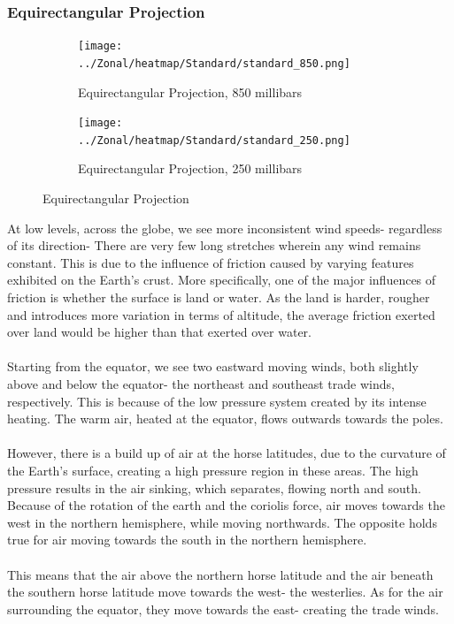 \documentclass[hidelinks]{article}
\begin{document}
\subsubsection{Equirectangular Projection}
\begin{figure}[h!]
	\begin{subfigure}[b]{\linewidth}
		\centering
		\texttt{[image: ../Zonal/heatmap/Standard/standard\_850.png]}
		\caption{Equirectangular Projection, 850 millibars}
	\end{subfigure}
	\begin{subfigure}[b]{\linewidth}
		\centering
		\texttt{[image: ../Zonal/heatmap/Standard/standard\_250.png]}
		\caption{Equirectangular Projection, 250 millibars}
	\end{subfigure}
	\caption{Equirectangular Projection}
\end{figure}
\newpage
\noindent At low levels, across the globe, we see more inconsistent wind speeds- regardless of its direction- There are very few long stretches wherein any wind remains constant. This is due to the influence of friction caused by varying features exhibited on the Earth's crust. 
More specifically, one of the major influences of friction is whether the surface is land or water. As the land is harder, rougher and introduces more variation in terms of altitude, the average friction exerted over land would be higher than that exerted over water.
\\\\
Starting from the equator, we see two eastward moving winds, both slightly above and below the equator- the northeast and southeast trade winds, respectively. This is because of the low pressure system created by its intense heating. The warm air, heated at the equator, flows outwards towards the poles. \\\\However, there is a build up of air at the horse latitudes, due to the curvature of the Earth's surface, creating a high pressure region in these areas. The high pressure results in the air sinking, which separates, flowing north and south. Because of the rotation of the earth and the coriolis force, air moves towards the west in the northern hemisphere, while moving northwards. The opposite holds true for air moving towards the south in the northern hemisphere. 
\\\\
This means that the air above the northern horse latitude and the air beneath the southern horse latitude move towards the west- the westerlies. As for the air surrounding the equator, they move towards the east- creating the trade winds.
\end{document}
